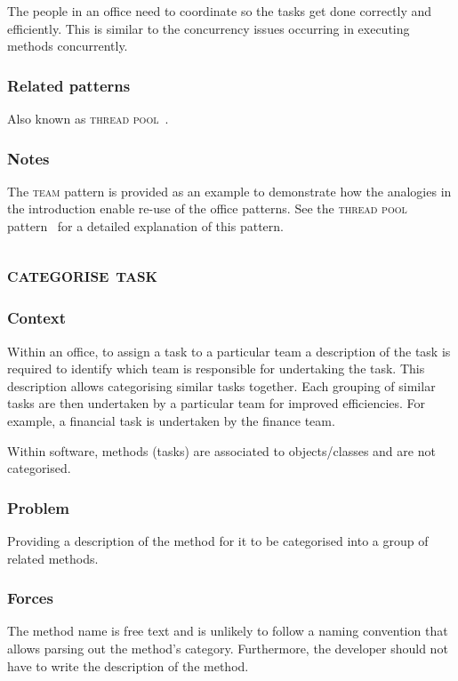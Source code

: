 \documentclass[prodmode]{style/acmlarge}
\begin{document}
The people in an office need to coordinate so the tasks get done correctly and
efficiently.  This is similar to the concurrency issues occurring in executing
methods concurrently.

\subsubsection*{Related patterns} Also known as \textsc{thread pool}~\cite{thread-per-request}.

\subsubsection*{Notes} The \textsc{team} pattern is provided as an example to
demonstrate how the analogies in the introduction enable re-use of the office
patterns. See the \textsc{thread pool} pattern~\cite{thread-per-request} for a
detailed explanation of this pattern.



\subsection{\textsc{\textbf{categorise task}}}

\subsubsection*{Context} Within an office, to assign a task to a particular team
a description of the task is required to identify which team is responsible for
undertaking the task.  This description allows categorising similar tasks
together.  Each grouping of similar tasks are then undertaken by a particular
team for improved efficiencies.  For example, a financial task is undertaken by
the finance team.

Within software, methods (tasks) are associated to objects/classes and are not
categorised.

\subsubsection*{\textbf{Problem}} Providing a description of the method for it to be
categorised into a group of related methods.

\subsubsection*{Forces} The method name is free text and is unlikely to follow a
naming convention that allows parsing out the method's category.  Furthermore, the
developer should not have to write the description of the method.
\end{document}
